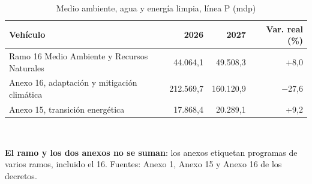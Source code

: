 \begin{table}[htbp]\centering\small
\caption{Medio ambiente, agua y energía limpia, línea P (mdp)}\label{cua:amb}
\begin{tabular}{lrrr}
\toprule
Vehículo & 2026 & 2027 & Var. real (\%) \\
\midrule
Ramo 16 Medio Ambiente y Recursos Naturales & 44.064,1 & 49.508,3 & +8,0 \\
Anexo 16, adaptación y mitigación climática & 212.569,7 & 160.120,9 & $-$27,6 \\
Anexo 15, transición energética & 17.868,4 & 20.289,1 & +9,2 \\
\bottomrule
\end{tabular}
\\[2pt]\begin{minipage}{0.92\textwidth}\scriptsize \textbf{El ramo y los dos anexos no se suman}: los anexos etiquetan programas de varios ramos, incluido el 16. Fuentes: Anexo 1, Anexo 15 y Anexo 16 de los decretos.\end{minipage}
\end{table}
